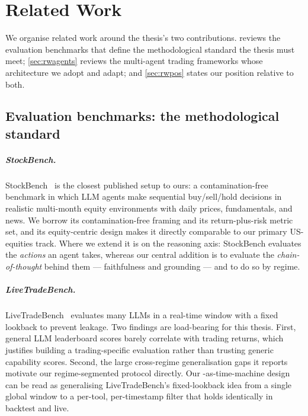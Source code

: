 \chapter{Related Work}
\label{ch:related}

We organise related work around the thesis's two contributions.  reviews
the evaluation benchmarks that define the methodological standard the thesis must meet;
\cref{sec:rwagents} reviews the multi-agent trading frameworks whose architecture we adopt
and adapt; and \cref{sec:rwpos} states our position relative to both.

\section{Evaluation benchmarks: the methodological standard}
\label{sec:rwbench}

\paragraph{StockBench.} StockBench~\cite{stockbench2025} is the closest published setup to
ours: a contamination-free benchmark in which LLM agents make sequential buy/sell/hold
decisions in realistic multi-month equity environments with daily prices, fundamentals, and
news. We borrow its contamination-free framing and its return-plus-risk metric set, and its
equity-centric design makes it directly comparable to our primary US-equities track. Where we
extend it is on the reasoning axis: StockBench evaluates the \emph{actions} an agent takes,
whereas our central addition is to evaluate the \emph{chain-of-thought} behind them ---
faithfulness and grounding --- and to do so by regime.

\paragraph{LiveTradeBench.} LiveTradeBench~\cite{livetradebench2025} evaluates many LLMs in a
real-time window with a fixed lookback to prevent leakage. Two findings are load-bearing for
this thesis. First, general LLM leaderboard scores barely correlate with trading returns,
which justifies building a trading-specific evaluation rather than trusting generic
capability scores. Second, the large cross-regime generalisation gaps it reports motivate our
regime-segmented protocol directly. Our \mcp-as-time-machine design can be read as
generalising LiveTradeBench's fixed-lookback idea from a single global window to a per-tool,
per-timestamp filter that holds identically in backtest and live.

